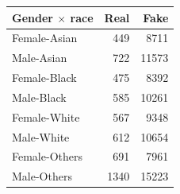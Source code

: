 \begin{tabular}{lrr}
\toprule
Gender $\times$ race & Real & Fake \\
\midrule
Female-Asian & 449 & 8711 \\
Male-Asian & 722 & 11573 \\
Female-Black & 475 & 8392 \\
Male-Black & 585 & 10261 \\
Female-White & 567 & 9348 \\
Male-White & 612 & 10654 \\
Female-Others & 691 & 7961 \\
Male-Others & 1340 & 15223 \\
\bottomrule
\end{tabular}
